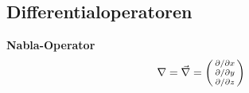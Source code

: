 \begin{table}[H]
\begin{tabularx}{0.9\columnwidth}{lXl}
\end{tabularx}
\end{table}

\subsection{Differentialoperatoren}
\textbf{Nabla-Operator}
\begin{align*}
    \nabla & = \vec{\nabla} = 
    \begin{psmallmatrix}
        \partial  / \partial x \\
        \partial  / \partial y \\
        \partial  / \partial z
    \end{psmallmatrix}
\end{align*}

